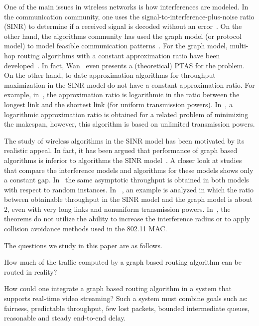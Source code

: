 \documentclass[12pt]{article}
\newenvironment{proof sketch}[1]{\noindent {\emph{Proof sketch of #1:}}}{\hfill \qed}
\begin{document}
One of the main issues in wireless networks is how interferences are
modeled. In the communication community, one uses the
signal-to-interference-plus-noise ratio (SINR) to determine if a
received signal is decoded without an
error~\cite{gallager1968information}. On the other hand, the
algorithms community has used the graph model (or protocol model) to
model feasible communication
patterns~\cite{jain2005impact,alicherry2005joint11}. For the graph
model, multi-hop routing algorithms with a constant approximation
ratio have been
developed~\cite{kumar2005algorithmic,alicherry2005joint11,buragohain2007improved,wan2009multiflows}.
In fact, Wan~\cite{wan2009multiflows} even presents a (theoretical)
PTAS for the problem. On the other hand, to date approximation algorithms for
throughput maximization in the SINR model do not have a constant
approximation ratio. For example, in~\cite{ChafekarCapacity}, the
approximation ratio is logarithmic in the ratio between the longest
link and the shortest link (for uniform transmission powers).
In~\cite{K10}, a logarithmic approximation ratio is obtained for a
related problem of minimizing the makespan, however, this algorithm is
based on unlimited transmission powers.

The study of wireless algorithms in the SINR model has been motivated
by its realistic appeal. In fact, it has been argued that performance
of graph based algorithms is inferior to algorithms the SINR
model~\cite{goussevskaia2007complexity}.  A closer look at studies
that compare the interference models and algorithms for these
models shows only a constant gap.
In~\cite{gupta2000capacity} the same asymptotic throughput is obtained
in both models with respect to random instances. In
~\cite{moscibroda2006protocol}, an example is analyzed in which the
ratio between obtainable throughput in the SINR model and the graph
model is about $2$, even with very long links and nonuniform
transmission powers. In~\cite{behzad2004performance}, the theorems do
not utilize the ability to increase the interference radius or to
apply collision avoidance methods used in the 802.11 MAC.

The questions we study in this paper are as follows.
\begin{inparaenum}[(i)]
\item How much of the traffic computed by a graph based routing
  algorithm can be routed in reality?
\item How could one integrate a graph based routing algorithm in a
  system that supports real-time video streaming? Such a system must
  combine goals such as: fairness, predictable throughput, few lost
  packets, bounded intermediate queues, reasonable and steady
  end-to-end delay.
\end{inparaenum}
\end{document}
